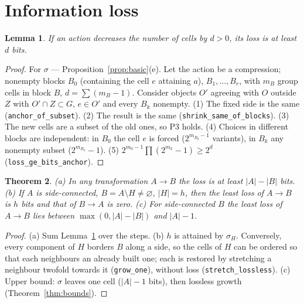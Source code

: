 \documentclass[11pt,a4paper]{article}
\theoremstyle{plain}
\newtheorem{theorem}{Theorem}[section]
\newtheorem{lemma}[theorem]{Lemma}
\theoremstyle{definition}
\theoremstyle{remark}
\newcommand{\lean}[1]{\texttt{#1}}
\begin{document}
\section{Information loss}\label{sec:loss}

\begin{lemma}\label{lem:bit}
If an action decreases the number of cells by $d>0$, its loss is at least $d$ bits.
\end{lemma}
\begin{proof}
For $\sigma$ — Proposition~\ref{prop:basic}(e). Let the action be a compression; nonempty blocks $B_0$ (containing the cell $e$ attaining $a$), $B_1,\dots,B_r$, with $m_B$ group cells in block $B$, $d=\sum(m_B-1)$. Consider objects $O'$ agreeing with $O$ outside $Z$ with $O'\cap Z\subset G$, $e\in O'$ and every $B_k$ nonempty. (1) The fixed side is the same (\lean{anchor\_of\_subset}). (2) The result is the same (\lean{shrink\_same\_of\_blocks}). (3) The new cells are a subset of the old ones, so P3 holds. (4) Choices in different blocks are independent: in $B_0$ the cell $e$ is forced ($2^{m_{B_0}-1}$ variants), in $B_k$ any nonempty subset ($2^{m_{B_k}}-1$). (5) $2^{m_0-1}\prod(2^{m_k}-1)\ge2^d$ (\lean{loss\_ge\_bits\_anchor}).
\end{proof}

\begin{theorem}\label{thm:loss}
(a) In any transformation $A\to B$ the loss is at least $|A|-|B|$ bits. (b) If $A$ is side-connected, $B=A\setminus H\ne\varnothing$, $|H|=h$, then the least loss of $A\to B$ is $h$ bits and that of $B\to A$ is zero. (c) For side-connected $B$ the least loss of $A\to B$ lies between $\max(0,|A|-|B|)$ and $|A|-1$.
\end{theorem}
\begin{proof}
(a) Sum Lemma~\ref{lem:bit} over the steps. (b) $h$ is attained by $\sigma_H$. Conversely, every component of $H$ borders $B$ along a side, so the cells of $H$ can be ordered so that each neighbours an already built one; each is restored by stretching a neighbour twofold towards it (\lean{grow\_one}), without loss (\lean{stretch\_lossless}). (c) Upper bound: $\sigma$ leaves one cell ($|A|-1$ bits), then lossless growth (Theorem~\ref{thm:bounds}).
\end{proof}
\end{document}

